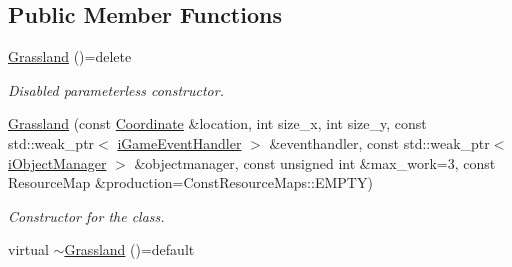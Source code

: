 \subsection*{Public Member Functions}
\begin{DoxyCompactItemize}
\item 
\hypertarget{class_course_1_1_grassland_a1263204b4995f7306d9a78c5769e30c0}{\hyperlink{class_course_1_1_grassland_a1263204b4995f7306d9a78c5769e30c0}{Grassland} ()=delete}\label{class_course_1_1_grassland_a1263204b4995f7306d9a78c5769e30c0}

\begin{DoxyCompactList}\small\item\em Disabled parameterless constructor. \end{DoxyCompactList}\item 
\hyperlink{class_course_1_1_grassland_ae5945a0163a4885da04970010b49074d}{Grassland} (const \hyperlink{class_course_1_1_coordinate}{Coordinate} \&location, int size\-\_\-x, int size\-\_\-y, const std\-::weak\-\_\-ptr$<$ \hyperlink{class_course_1_1i_game_event_handler}{i\-Game\-Event\-Handler} $>$ \&eventhandler, const std\-::weak\-\_\-ptr$<$ \hyperlink{class_course_1_1i_object_manager}{i\-Object\-Manager} $>$ \&objectmanager, const unsigned int \&max\-\_\-work=3, const Resource\-Map \&production=Const\-Resource\-Maps\-::\-E\-M\-P\-T\-Y)
\begin{DoxyCompactList}\small\item\em Constructor for the class. \end{DoxyCompactList}\item 
\hypertarget{class_course_1_1_grassland_aa660837530ab2dcc563c9557ec599066}{virtual \hyperlink{class_course_1_1_grassland_aa660837530ab2dcc563c9557ec599066}{$\sim$\-Grassland} ()=default}\label{class_course_1_1_grassland_aa660837530ab2dcc563c9557ec599066}


\end{DoxyCompactItemize}
